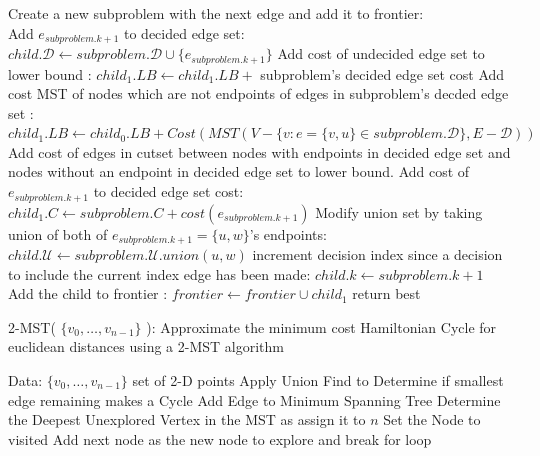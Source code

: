 \documentclass[format=sigconf]{acmart}
\begin{document}
\begin{algorithm}[H]
\begin{algorithmic}
						\ENDIF
					\ELSE
						\STATE Create a new subproblem with the next edge and add it to frontier:\\
						\vspace{4pt}
						\STATE Add $e_{subproblem.k+1}$ to decided edge set: $child.\mathcal{D} \leftarrow subproblem.\mathcal{D} \cup \{ e_{subproblem.k+1} \}$
						\STATE Add cost of undecided edge set to lower bound : $child_1.LB \leftarrow child_1.LB + $ subproblem's decided edge set cost
						\STATE Add cost MST of nodes which are not endpoints of edges in subproblem's decded edge set : \\
						$child_1.LB \leftarrow child_0.LB + Cost( MST( V - \{ v : e = \{ v,u \} \in subproblem.\mathcal{D} \}, E-\mathcal{D} ) )$ 
						\STATE Add cost of edges in cutset between nodes with endpoints in decided edge set and nodes without an endpoint in decided edge set to lower bound.
						\STATE Add cost of $e_{subproblem.k+1}$ to decided edge set cost: $child_1.C \leftarrow subproblem.C + cost(e_{subproblem.k+1})$ 
						\STATE Modify union set by taking union of both of $e_{subproblem.k+1}=\{u,w\}$'s endpoints: $child.\mathcal{U} \leftarrow subproblem.\mathcal{U}.union(u,w)$ 
						\STATE increment decision index since a decision to include the current index edge has been made: $child.k \leftarrow subproblem.k+1$
						\STATE Add the child to frontier : $frontier \leftarrow frontier \cup child_1$
					\ENDIF 
				\ENDIF
			\ENDIF
		\ENDWHILE
		\STATE return best
	\end{algorithmic}
\end{algorithm}
\begin{algorithm}[H] 
	\caption{  2-MST( $\{v_0, \hdots, v_{n-1}\}$ ): Approximate the minimum cost Hamiltonian Cycle for euclidean distances using a 2-MST algorithm}
	\begin{algorithmic} 
		\STATE Data: $\{v_0, \hdots, v_{n-1}\}$ set of 2-D points
            \STATE Apply Union Find to Determine if smallest edge remaining makes a Cycle
                \STATE Add Edge to Minimum Spanning Tree
            \ENDIF
        \ENDWHILE
            \STATE Determine the Deepest Unexplored Vertex in the MST as assign it to $n$
                    \STATE Set the Node to visited
                        \STATE Add next node as the new node to explore and break for loop
                    \ENDIF
                \ENDIF
            \ENDFOR
        \ENDWHILE

	\end{algorithmic}
\end{algorithm}
\end{document}
